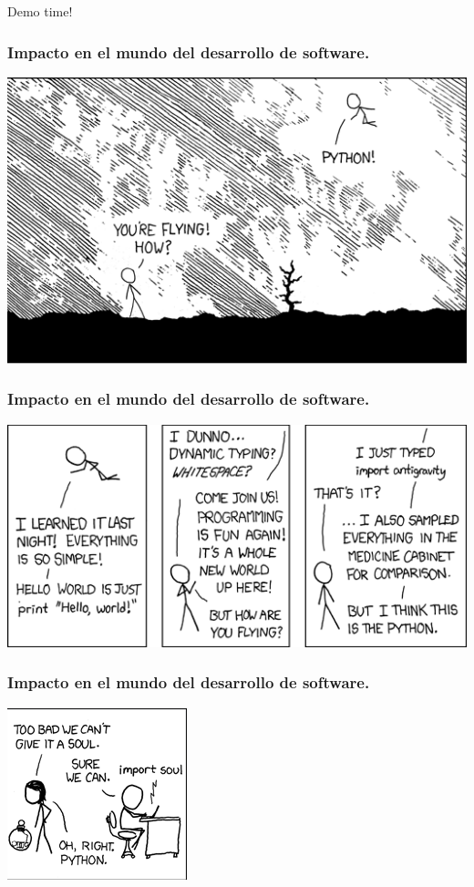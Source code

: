 \documentclass{beamer}
\begin{document}
\begin{frame}
Demo time!
\end{frame}

\begin{frame}
\frametitle{Impacto en el mundo del desarrollo de software.}
\includegraphics[width=0.9\linewidth]{python_1.png}
\end{frame}

\begin{frame}
\frametitle{Impacto en el mundo del desarrollo de software.}
\includegraphics[width=0.9\linewidth]{python_2.png}
\end{frame}

\begin{frame}
\frametitle{Impacto en el mundo del desarrollo de software.}
\begin{center}
\includegraphics[height=0.75\textheight]{new_pet_cropped.png}
\end{center}
\end{frame}
\end{document}
